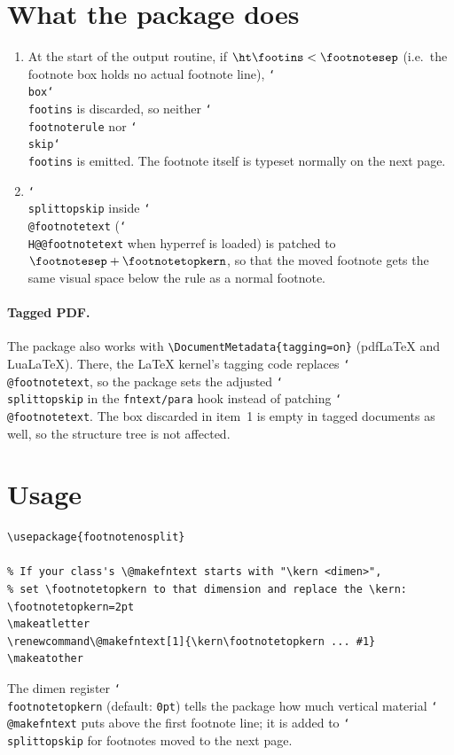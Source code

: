 \documentclass{article}
\newcommand*\cs[1]{\texttt{\char`\\#1}}
\newcommand*\pkg[1]{\textsf{#1}}
\begin{document}
\section{What the package does}

\begin{enumerate}
\item At the start of the output routine, if
  $\cs{ht}\cs{footins} < \cs{footnotesep}$ (i.e.\ the footnote box
  holds no actual footnote line), \cs{box}\cs{footins} is discarded,
  so neither \cs{footnoterule} nor \cs{skip}\cs{footins} is emitted.
  The footnote itself is typeset normally on the next page.
\item \cs{splittopskip} inside \cs{@footnotetext}
  (\cs{H@@footnotetext} when \pkg{hyperref} is loaded) is patched to
  $\cs{footnotesep} + \cs{footnotetopkern}$, so that the moved footnote
  gets the same visual space below the rule as a normal footnote.
\end{enumerate}

\paragraph{Tagged PDF.}
The package also works with \verb|\DocumentMetadata{tagging=on}|
(pdf\LaTeX{} and Lua\LaTeX).  There, the \LaTeX{} kernel's tagging
code replaces \cs{@footnotetext}, so the package sets the adjusted
\cs{splittopskip} in the \texttt{fntext/para} hook instead of patching
\cs{@footnotetext}.  The box discarded in item~1 is empty in tagged
documents as well, so the structure tree is not affected.

\section{Usage}

\begin{verbatim}
\usepackage{footnotenosplit}

% If your class's \@makefntext starts with "\kern <dimen>",
% set \footnotetopkern to that dimension and replace the \kern:
\footnotetopkern=2pt
\makeatletter
\renewcommand\@makefntext[1]{\kern\footnotetopkern ... #1}
\makeatother
\end{verbatim}

\noindent
The dimen register \cs{footnotetopkern} (default: \texttt{0pt}) tells
the package how much vertical material \cs{@makefntext} puts above the
first footnote line; it is added to \cs{splittopskip} for footnotes
moved to the next page.
\end{document}

